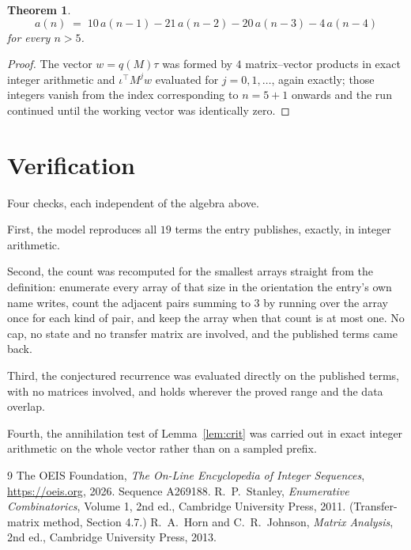 \documentclass[11pt,a4paper]{article}
\theoremstyle{plain}
\newtheorem{theorem}{Theorem}
\theoremstyle{definition}
\begin{document}
\begin{theorem}
\[
a(n)\;=\;10\,a(n-1) - 21\,a(n-2) - 20\,a(n-3) - 4\,a(n-4)
\]
for every $n>5$.
\end{theorem}

\begin{proof}
The vector $w=q(M)\tau$ was formed by $4$ matrix--vector products in exact integer
arithmetic and $\iota^{\!\top}M^{j}w$ evaluated for $j=0,1,\dots$, again exactly; those
integers vanish from the index corresponding to $n=5+1$ onwards and the run continued
until the working vector was identically zero.
\end{proof}

\section{Verification}

Four checks, each independent of the algebra above.

First, the model reproduces all $19$ terms the entry publishes, exactly, in integer
arithmetic.

Second, the count was recomputed for the smallest arrays straight from the definition:
enumerate every array of that size in the orientation the entry's own name writes, count the
adjacent pairs summing to $3$ by running over the array once for each kind of pair, and keep
the array when that count is at most one. No cap, no state and no transfer matrix are involved, and
the published terms came back.

Third, the conjectured recurrence was evaluated directly on the published terms, with no
matrices involved, and holds wherever the proved range and the data overlap.

Fourth, the annihilation test of Lemma~\ref{lem:crit} was carried out in exact integer
arithmetic on the whole vector rather than on a sampled prefix.

\begin{thebibliography}{9}
 The OEIS Foundation, \emph{The On-Line Encyclopedia of Integer
Sequences}, \url{https://oeis.org}, 2026. Sequence A269188.
 R.~P.~Stanley, \emph{Enumerative Combinatorics}, Volume 1, 2nd ed.,
Cambridge University Press, 2011. (Transfer-matrix method, Section 4.7.)
 R.~A.~Horn and C.~R.~Johnson, \emph{Matrix Analysis}, 2nd ed., Cambridge
University Press, 2013.
\end{thebibliography}
\end{document}
